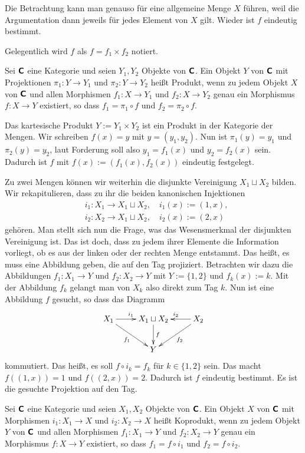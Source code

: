Die Betrachtung kann man genauso für eine allgemeine Menge $X$ führen,
weil die Argumentation dann jeweils für jedes Element von $X$ gilt.
Wieder ist $f$ eindeutig bestimmt.

Gelegentlich wird $f$ als $f=f_1\times f_2$ notiert.

\begin{Definition}[Produkt]\newlinefirst
Sei $\textsf{\textbf{C}}$ eine Kategorie und seien $Y_1,Y_2$ Objekte von
$\textsf{\textbf{C}}$. Ein Objekt $Y$ von $\textsf{\textbf{C}}$ mit Projektionen
$\pi_1\colon Y\to Y_1$ und $\pi_2\colon Y\to Y_2$ heißt Produkt, wenn
zu jedem Objekt $X$ von $\textsf{\textbf{C}}$ und allen Morphismen
$f_1\colon X\to Y_1$ und $f_2\colon X\to Y_2$ genau ein Morphismus
$f\colon X\to Y$ existiert, so dass $f_1=\pi_1\circ f$ und
$f_2=\pi_2\circ f$.
\end{Definition}

\noindent
Das kartesische Produkt $Y:=Y_1\times Y_2$ ist ein Produkt in
der Kategorie der Mengen. Wir schreiben $f(x)=y$ mit $y=(y_1,y_2)$.
Nun ist $\pi_1(y)=y_1$ und $\pi_2(y)=y_2$, laut Forderung soll also
$y_1=f_1(x)$ und $y_2=f_2(x)$ sein. Dadurch ist $f$ mit
$f(x):=(f_1(x),f_2(x))$ eindeutig festgelegt.

Zu zwei Mengen können wir weiterhin die disjunkte Vereinigung
$X_1\sqcup X_2$ bilden. Wir rekapitulieren, dass zu ihr die beiden
kanonischen Injektionen
\begin{align*}
& i_1\colon X_1\to X_1\sqcup X_2,\quad i_1(x) := (1,x),\\
& i_2\colon X_2\to X_1\sqcup X_2,\quad i_2(x) := (2,x)
\end{align*}
gehören. Man stellt sich nun die Frage, was das Wesensmerkmal
der disjunkten Vereinigung ist. Das ist doch, dass zu jedem ihrer
Elemente die Information vorliegt, ob es aus der linken oder der
rechten Menge entstammt. Das heißt, es muss eine Abbildung geben,
die auf den Tag projiziert. Betrachten wir dazu die Abbildungen
$f_1\colon X_1\to Y$ und $f_2\colon X_2\to Y$ mit $Y:=\{1,2\}$ und
$f_k(x):=k$. Mit der Abbildung $f_k$ gelangt man von $X_k$ also
direkt zum Tag $k$. Nun ist eine Abbildung $f$ gesucht, so dass das
Diagramm
\[\xymatrix{
X_1\ar[r]^{i_1}\ar[dr]_{f_1} & X_1\sqcup X_2\ar[d]^{f}
& X_2\ar[l]_{i_2}\ar[dl]^{f_2}\\
& Y &
}\]
kommutiert. Das heißt, es soll $f\circ i_k = f_k$ für $k\in\{1,2\}$ sein.
Das macht $f((1,x)) = 1$ und $f((2,x)) = 2$. Dadurch ist $f$ eindeutig
bestimmt. Es ist die gesuchte Projektion auf den Tag.

\begin{Definition}[Koprodukt]\newlinefirst
Sei $\textsf{\textbf{C}}$ eine Kategorie und seien $X_1,X_2$ Objekte von
$\textsf{\textbf{C}}$. Ein Objekt $X$ von $\textsf{\textbf{C}}$ mit Morphismen
$i_1\colon X_1\to X$ und $i_2\colon X_2\to X$
heißt Koprodukt, wenn zu jedem Objekt $Y$ von $\textsf{\textbf{C}}$ und allen
Morphismen $f_1\colon X_1\to Y$ und $f_2\colon X_2\to Y$ genau ein
Morphismus $f\colon X\to Y$ existiert, so dass $f_1 = f\circ i_1$
und $f_2 = f\circ i_2$.
\end{Definition}

